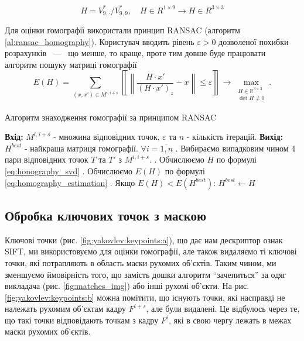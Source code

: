 \begin{equation}
    H = V^{*}_{9,\cdot }/V^{*}_{9,9},\quad H \in R^{1 \times 9} \rightarrow H \in R^{3 \times 3}
    \label{eq:honography_svd}
\end{equation}

Для оцінки гомографії використали принцип RANSAC \cite{ransac} (алгоритм \ref{al:ransac_homography}).
Користувач вводить рівень \(\varepsilon > 0\)
дозволеної похибки розрахунків ~---~ що менше, то краще, проте тим довше
буде працювати алгоритм пошуку матриці гомографії
\begin{equation}
    E(H) = \sum_{(x,x') \in M^{i,i+s}}
    \left\llbracket \left\lVert
    \frac{H\cdot x'}{(H\cdot x')_z} - x
    \right\rVert \leq \varepsilon
    \right\rrbracket
    \to \max\limits_{\substack{H \in \mathbb{R}^{3 \times 3} \\ \det{H} \neq 0}}.
    \label{eq:homography_estimation}
\end{equation}

\begin{algorithm}[H]
    \caption{Алгоритм знаходження гомографії за принципом RANSAC}
    \label{al:ransac_homography}
    \begin{algorithmic}
        \State \textbf{Вхід:} $M^{i,i+s}$ - множина відповідних точок, $\varepsilon$ та $n$ - кількість ітерацій.
        \State \textbf{Вихід:} $H^{best}$ - найкраща матриця гомографії.
        \State $\forall i = \overline{1,n}$
        \State {}. Вибираємо випадковим чином 4 пари відповідних точок $T$ та $T'$ з $M^{i,i+s}$.
        \State {}. Обчислюємо $H$ по формулі \eqref{eq:honography_svd}
        \State {}. Обчислюємо $E(H)$ по формулі \eqref{eq:homography_estimation}
        \State {}. Якщо  $E(H) < E(H^{best})$:
        \State \qquad $H^{best} \gets H$
    \end{algorithmic}
\end{algorithm}

\subsection{Обробка ключових точок з маскою}

Ключові точки (рис. \ref{fig:yakovlev:keypoints:a}), що дає нам дескриптор ознак SIFT, ми
використовуємо для оцінки гомографії, але також видаляємо ті ключові
точки, які потрапляють в область маски рухомих об'єктів.
Таким чином, ми зменшуємо ймовірність того, що замість дошки алгоритм ``зачепиться'' за одяг
викладача (рис. \ref{fig:matches_img}) або інші рухомі об'єкти.
На рис. \ref{fig:yakovlev:keypoints:b} можна помітити, що
існують точки, які насправді не належать рухомим об'єктам кадру
\(F^{i + s}\), але були видалені. Це відбулось через те, що такі точки
відповідають точкам з кадру \(F^{i}\), які в свою чергу лежать в межах маски рухомих об'єктів.

